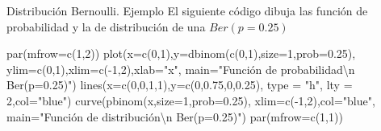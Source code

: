 \documentclass[
  ignorenonframetext,
  aspectratio=169]{beamer}
\newenvironment{Shaded}{\begin{snugshade}}{\end{snugshade}}
\newcommand{\AttributeTok}[1]{\textcolor[rgb]{0.40,0.45,0.13}{#1}}
\newcommand{\DecValTok}[1]{\textcolor[rgb]{0.68,0.00,0.00}{#1}}
\newcommand{\FloatTok}[1]{\textcolor[rgb]{0.68,0.00,0.00}{#1}}
\newcommand{\FunctionTok}[1]{\textcolor[rgb]{0.28,0.35,0.67}{#1}}
\newcommand{\NormalTok}[1]{\textcolor[rgb]{0.00,0.23,0.31}{#1}}
\newcommand{\SpecialCharTok}[1]{\textcolor[rgb]{0.37,0.37,0.37}{#1}}
\newcommand{\StringTok}[1]{\textcolor[rgb]{0.13,0.47,0.30}{#1}}
\begin{document}
\begin{frame}[fragile]{Distribución Bernoulli. Ejemplo}
\protect\hypertarget{distribuciuxf3n-bernoulli.-ejemplo-1}{}
El siguiente código dibuja las función de probabilidad y la de
distribución de una \(Ber(p=0.25)\)

\begin{Shaded}
\begin{Highlighting}[]
\FunctionTok{par}\NormalTok{(}\AttributeTok{mfrow=}\FunctionTok{c}\NormalTok{(}\DecValTok{1}\NormalTok{,}\DecValTok{2}\NormalTok{))}
\FunctionTok{plot}\NormalTok{(}\AttributeTok{x=}\FunctionTok{c}\NormalTok{(}\DecValTok{0}\NormalTok{,}\DecValTok{1}\NormalTok{),}\AttributeTok{y=}\FunctionTok{dbinom}\NormalTok{(}\FunctionTok{c}\NormalTok{(}\DecValTok{0}\NormalTok{,}\DecValTok{1}\NormalTok{),}\AttributeTok{size=}\DecValTok{1}\NormalTok{,}\AttributeTok{prob=}\FloatTok{0.25}\NormalTok{),}
     \AttributeTok{ylim=}\FunctionTok{c}\NormalTok{(}\DecValTok{0}\NormalTok{,}\DecValTok{1}\NormalTok{),}\AttributeTok{xlim=}\FunctionTok{c}\NormalTok{(}\SpecialCharTok{{-}}\DecValTok{1}\NormalTok{,}\DecValTok{2}\NormalTok{),}\AttributeTok{xlab=}\StringTok{"x"}\NormalTok{,}
     \AttributeTok{main=}\StringTok{"Función de probabilidad}\SpecialCharTok{\textbackslash{}n}\StringTok{ Ber(p=0.25)"}\NormalTok{)}
\FunctionTok{lines}\NormalTok{(}\AttributeTok{x=}\FunctionTok{c}\NormalTok{(}\DecValTok{0}\NormalTok{,}\DecValTok{0}\NormalTok{,}\DecValTok{1}\NormalTok{,}\DecValTok{1}\NormalTok{),}\AttributeTok{y=}\FunctionTok{c}\NormalTok{(}\DecValTok{0}\NormalTok{,}\FloatTok{0.75}\NormalTok{,}\DecValTok{0}\NormalTok{,}\FloatTok{0.25}\NormalTok{), }\AttributeTok{type =} \StringTok{"h"}\NormalTok{, }\AttributeTok{lty =} \DecValTok{2}\NormalTok{,}\AttributeTok{col=}\StringTok{"blue"}\NormalTok{)}
\FunctionTok{curve}\NormalTok{(}\FunctionTok{pbinom}\NormalTok{(x,}\AttributeTok{size=}\DecValTok{1}\NormalTok{,}\AttributeTok{prob=}\FloatTok{0.25}\NormalTok{),}
      \AttributeTok{xlim=}\FunctionTok{c}\NormalTok{(}\SpecialCharTok{{-}}\DecValTok{1}\NormalTok{,}\DecValTok{2}\NormalTok{),}\AttributeTok{col=}\StringTok{"blue"}\NormalTok{,}
      \AttributeTok{main=}\StringTok{"Función de distribución}\SpecialCharTok{\textbackslash{}n}\StringTok{ Ber(p=0.25)"}\NormalTok{)}
\FunctionTok{par}\NormalTok{(}\AttributeTok{mfrow=}\FunctionTok{c}\NormalTok{(}\DecValTok{1}\NormalTok{,}\DecValTok{1}\NormalTok{))}
\end{Highlighting}
\end{Shaded}
\end{frame}
\end{document}
